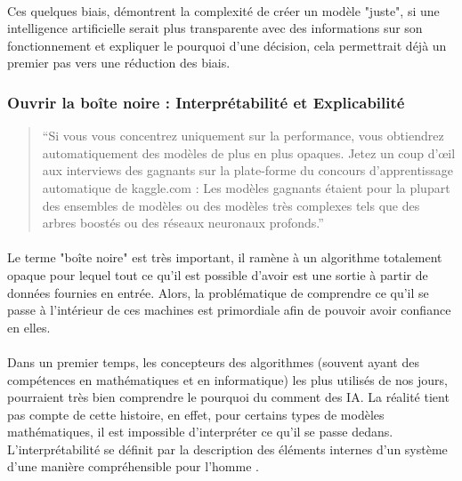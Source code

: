 \documentclass[10pt, french, a4paper]{report}
\begin{document}
\paragraph{}
Ces quelques biais, démontrent la complexité de créer un modèle "juste", si une intelligence artificielle serait plus transparente avec des informations sur son fonctionnement et expliquer le pourquoi d’une décision, cela permettrait déjà un premier pas vers une réduction des biais.

\subsubsection{Ouvrir la boîte noire : Interprétabilité et Explicabilité}
\label{subsec:explicabilite}

\begin{quotation}
  ``Si vous vous concentrez uniquement sur la performance, vous obtiendrez automatiquement des modèles de plus en plus opaques. Jetez un coup d'œil aux interviews des gagnants sur la plate-forme du concours d'apprentissage automatique de kaggle.com : Les modèles gagnants étaient pour la plupart des ensembles de modèles ou des modèles très complexes tels que des arbres boostés ou des réseaux neuronaux profonds.''
\end{quotation}

\paragraph{}
Le terme "boîte noire" est très important, il ramène à un algorithme totalement opaque pour lequel tout ce qu’il est possible d’avoir est une sortie à partir de données fournies en entrée. Alors, la problématique de comprendre ce qu’il se passe à l’intérieur de ces machines est primordiale afin de pouvoir avoir confiance en elles.

\paragraph{}
Dans un premier temps, les concepteurs des algorithmes (souvent ayant des compétences en mathématiques et en informatique) les plus utilisés de nos jours, pourraient très bien comprendre le pourquoi du comment des IA. La réalité tient pas compte de cette histoire, en effet, pour certains types de modèles mathématiques, il est impossible d’interpréter ce qu’il se passe dedans. L’interprétabilité se définit par la description des éléments internes d’un système d’une manière compréhensible pour l’homme \citep{gilpin_explaining_2018}.
\end{document}
